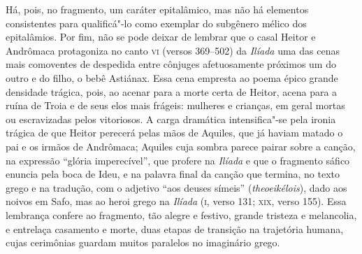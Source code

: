 {Há, pois, no fragmento, um caráter epitalâmico, mas não há elementos consistentes para
qualificá"-lo como exemplar do subgênero mélico dos epitalâmios. Por fim, não se
pode deixar de lembrar que o casal Heitor e Andrômaca protagoniza no canto \textsc{vi}
(versos 369--502) da \textit{Ilíada} uma das cenas mais comoventes de despedida
entre cônjuges afetuosamente próximos um do outro e do filho, o bebê Astiánax.
Essa cena empresta ao poema épico grande densidade trágica, pois, ao acenar
para a morte certa de Heitor, acena para a ruína de Troia e de seus elos mais
frágeis: mulheres e crianças, em geral mortas ou escravizadas pelos vitoriosos.
A carga dramática intensifica"-se pela ironia trágica de que Heitor perecerá
pelas mãos de Aquiles, que já haviam matado o pai e os irmãos de Andrômaca; Aquiles cuja sombra parece pairar sobre a canção, na expressão ``glória imperecível'', que profere na \textit{Ilíada} e que o fragmento sáfico enuncia pela boca de Ideu, e na palavra final da canção que termina, no texto grego e na tradução, com o adjetivo ``aos deuses símeis'' (\textit{theoeikélois}), dado aos noivos em Safo, mas ao heroi grego na \textit{Ilíada} (\textsc{i}, verso 131; \textsc{xix}, verso 155).
Essa lembrança confere ao fragmento, tão alegre e festivo, grande tristeza e
melancolia, e entrelaça casamento e morte, duas etapas de transição na trajetória
humana, cujas cerimônias guardam muitos paralelos no imaginário grego.}

